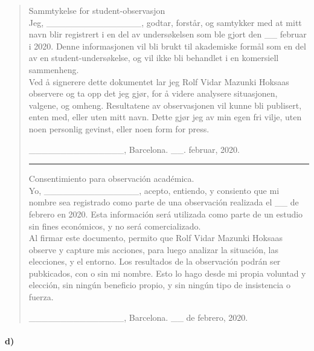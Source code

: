 \documentclass{../../myassignment}
\begin{document}
	\begin{quote}
		Sammtykelse for student-observasjon\\

		Jeg, \_\_\_\_\_\_\_\_\_\_\_\_\_\_\_, godtar, forst{\aa}r, og samtykker med at mitt navn blir registrert i en del av unders{\o}kelsen som ble gjort den \_\_ februar i 2020. Denne informasjonen vil bli brukt til akademiske form{\aa}l som en del av en student-unders{\o}kelse, og vil ikke bli behandlet i en komersiell sammenheng.\\

		Ved {\aa} signerere dette dokumentet lar jeg Rolf Vidar Mazunki Hoksaas observere og ta opp det jeg gj{\o}r, for {\aa} videre analysere situasjonen, valgene, og omheng. Resultatene av observasjonen vil kunne bli publisert, enten med, eller uten mitt navn. Dette gj{\o}r jeg av min egen fri vilje, uten noen personlig gevinst, eller noen form for press. 

		\vspace{1cm}

		\_\_\_\_\_\_\_\_\_\_\_\_\_\_\_, Barcelona. \_\_. februar, 2020.

		\vspace{5mm}\hrule\vspace{5mm}
	
		Consentimiento para observaci\'on acad\'emica.\\

		Yo, \_\_\_\_\_\_\_\_\_\_\_\_\_\_\_, acepto, entiendo, y consiento que mi nombre sea registrado como parte de una observaci\'on realizada el \_\_ de febrero en 2020. Esta informaci\'on ser\'a utilizada como parte de un estudio sin fines econ\'omicos, y no ser\'a comercializado.\\

		Al firmar este documento, permito que Rolf Vidar Mazunki Hoksaas observe y capture mis acciones, para luego analizar la situaci\'on, las elecciones, y el entorno. Los resultados de la observaci\'on podr\'an ser pubkicados, con o sin mi nombre. Esto lo hago desde mi propia voluntad y elecci\'on, sin ning\'un beneficio propio, y sin ning\'un tipo de insistencia o fuerza. 

		\vspace{1cm}

		\_\_\_\_\_\_\_\_\_\_\_\_\_\_\_, Barcelona. \_\_ de febrero, 2020.
	\end{quote}


	\paragraph*{d)}
\end{document}
